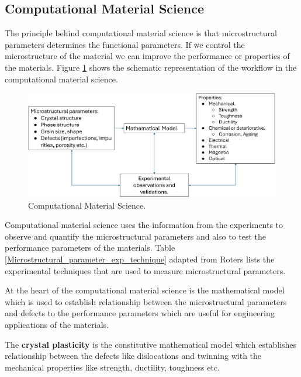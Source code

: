 \subsection{Computational Material Science}

The principle behind computational material science is that microstructural parameters determines the functional parameters. If we control the microstructure of the material we can improve the performance or properties of the materials. Figure \ref{Computational_materials} shows the schematic representation of the workflow in the computational material science.

\begin{figure}[H]
    \centering
    \includegraphics[width=\textwidth]{images/Computational_materials.pdf}
    \caption{Computational Material Science.}
    \label{Computational_materials}
\end{figure}

Computational material science uses the information from the experiments to observe and quantify the microstructural parameters and also to test the performance parameters of the materials. Table
\ref{Microstructural_parameter_exp_technique} adapted from Roters \cite{roters2011advanced} lists the experimental techniques that are used to measure microstructural parameters. 

At the heart of the computational material science is the mathematical model which is used to establish relationship between the microstructural parameters and defects to the performance parameters which are useful for engineering applications of the materials.

The \textbf{crystal plasticity} is the constitutive mathematical model which establishes relationship between the defects like dislocations and twinning with the mechanical properties like strength, ductility, toughness etc. 

